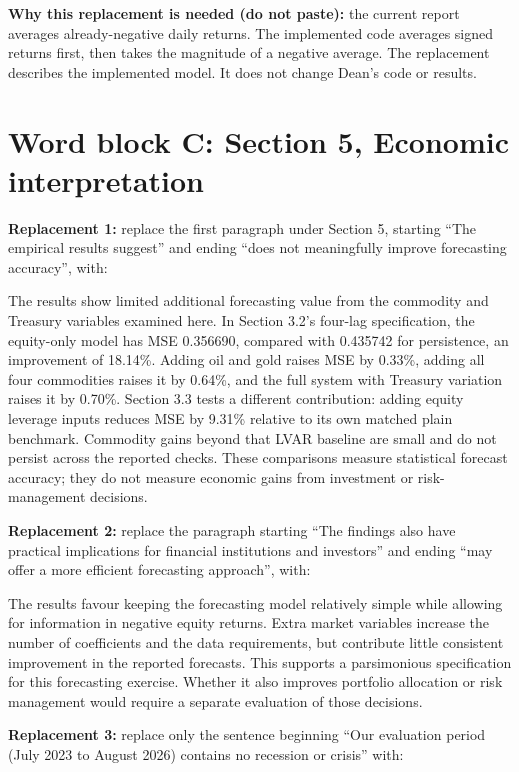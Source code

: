 \documentclass[11pt,a4paper]{article}
\begin{document}
\medskip
\textbf{Why this replacement is needed (do not paste):} the current report averages already-negative daily returns. The implemented code averages signed returns first, then takes the magnitude of a negative average. The replacement describes the implemented model. It does not change Dean's code or results.

\clearpage
\section*{Word block C: Section 5, Economic interpretation}

\textbf{Replacement 1:} replace the first paragraph under Section 5, starting ``The empirical results suggest'' and ending ``does not meaningfully improve forecasting accuracy'', with:

The results show limited additional forecasting value from the commodity and Treasury variables examined here. In Section 3.2's four-lag specification, the equity-only model has MSE 0.356690, compared with 0.435742 for persistence, an improvement of 18.14\%. Adding oil and gold raises MSE by 0.33\%, adding all four commodities raises it by 0.64\%, and the full system with Treasury variation raises it by 0.70\%. Section 3.3 tests a different contribution: adding equity leverage inputs reduces MSE by 9.31\% relative to its own matched plain benchmark. Commodity gains beyond that LVAR baseline are small and do not persist across the reported checks. These comparisons measure statistical forecast accuracy; they do not measure economic gains from investment or risk-management decisions.

\textbf{Replacement 2:} replace the paragraph starting ``The findings also have practical implications for financial institutions and investors'' and ending ``may offer a more efficient forecasting approach'', with:

The results favour keeping the forecasting model relatively simple while allowing for information in negative equity returns. Extra market variables increase the number of coefficients and the data requirements, but contribute little consistent improvement in the reported forecasts. This supports a parsimonious specification for this forecasting exercise. Whether it also improves portfolio allocation or risk management would require a separate evaluation of those decisions.

\textbf{Replacement 3:} replace only the sentence beginning ``Our evaluation period (July 2023 to August 2026) contains no recession or crisis'' with:
\end{document}
